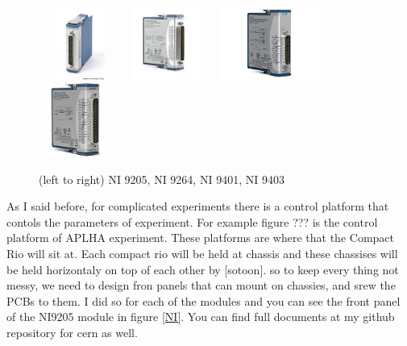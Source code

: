 \documentclass[12pt,a4paper]{article}
\begin{document}
\begin{figure}
\centering
\includegraphics[width=27mm, height=24mm]{ni9205}
\includegraphics[width=27mm, height=24mm]{ni9264}
\includegraphics[width=38mm, height=24mm]{ni9401}
\includegraphics[width=24mm, height=24mm]{ni9403}
\caption{(left to right) NI 9205, NI 9264, NI 9401, NI 9403}
\label{module}
\end{figure}

As I said before, for complicated experiments there is a control platform that contols the parameters of experiment. For example figure ??? is the control platform of APLHA experiment.
These platforms are where that the Compact Rio will sit at. Each compact rio will be held at chassis and these chassises will be held horizontaly on top of each other by [sotoon]. so to keep every thing not messy, we need to design fron panels that can mount on chassies, and srew the PCBs to them. I did so for each of the modules and you can see the front panel of the NI9205 module in figure \ref{NI}. You can find full documents at my github repository for cern as well.
\end{document}

